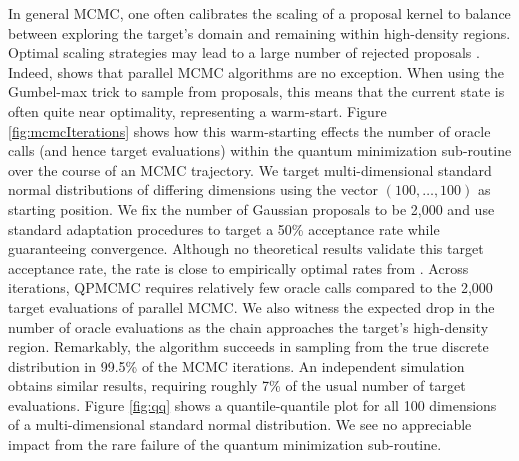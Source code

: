 \documentclass[12pt]{article} %
\begin{document}
In general MCMC, one often calibrates the scaling of a proposal kernel to balance between exploring the target's domain and remaining within high-density regions.  Optimal scaling strategies may lead to a large number of rejected proposals \citep{roberts2001optimal}.  Indeed, \citet{holbrook2021generating} shows that parallel MCMC algorithms are no exception. When using the Gumbel-max trick to sample from proposals, this means that the current state is often quite near optimality, representing a warm-start.  Figure \ref{fig:mcmcIterations} shows how this warm-starting effects the number of oracle calls (and hence target evaluations) within the quantum minimization sub-routine over the course of an MCMC trajectory.  We target multi-dimensional standard normal distributions of differing dimensions using the vector $(100,\dots,100)$ as starting position. We fix the number of Gaussian proposals to be 2,000 and use standard adaptation procedures \citep{rosenthal2011optimal} to target a 50\% acceptance rate while guaranteeing convergence. Although no theoretical results validate this target acceptance rate, the rate is close to empirically optimal rates from \citet{holbrook2021generating}. Across iterations, QPMCMC requires relatively few oracle calls compared to the 2,000 target evaluations of parallel MCMC. We also witness the expected drop in the number of oracle evaluations as the chain approaches the target's high-density region. Remarkably, the algorithm succeeds in sampling from the true discrete distribution in 99.5\% of the MCMC iterations. An independent simulation obtains similar results, requiring roughly 7\% of the usual number of target evaluations. Figure \ref{fig:qq} shows a quantile-quantile plot for all 100 dimensions of a multi-dimensional standard normal distribution. We see no appreciable impact from the rare failure of the quantum minimization sub-routine.

\end{document}
